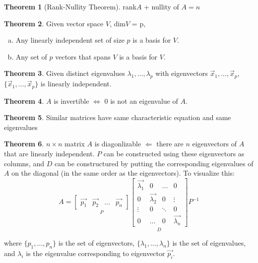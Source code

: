 \documentclass[a4paper,12pt]{article}
\theoremstyle{definition}
\newtheorem{theorem}{Theorem}
\theoremstyle{definition}
\newcommand{\finitevecs}[2]{#1_1,\ldots,#1_#2}
\newcommand{\finitevecsset}[2]{\{\finitevecs{#1}{#2}\}}
\begin{document}
	\begin{theorem}[Rank-Nullity Theorem]
		\label{thm:rank-nul-thm}
		rank$A$ + nullity of $A = n$
	\end{theorem}
	
	\begin{theorem}
		\label{thm:vec-spc-dim-thm}
		Given vector space $V$, dim$V$ = p,
		\begin{enumerate}[a.]
			\item Any linearly independent set of size $p$ is a basis for $V$.
			
			\item Any set of $p$ vectors that spans $V$ is a basis for $V$.
		\end{enumerate}
	\end{theorem}
	
	\begin{theorem}
		\label{thm:eigen-vec-lin-indep-thm}
		Given distinct eigenvalues $\finitevecs{\lambda}{p}$ with eigenvectors $\finitevecs{\vec{x}}{p}$, $\finitevecsset{\vec{x}}{p}$ is linearly independent.
	\end{theorem}
	
	\begin{theorem}
		\label{thm:zero-eigenval-invertibility-thm}
		$A$ is invertible $\Leftrightarrow$ 0 is not an eigenvalue of $A$.
	\end{theorem}
	
	\begin{theorem}
		\label{similar-mat-char-eq-thm}
		Similar matrices have same characteristic equation and same eigenvalues
	\end{theorem}
	
	\begin{theorem}
		\label{thm:diagonlization-thm}
		$n \times n$ matrix $A$ is diagonlizable $\Leftarrow$ there are $n$ eigenvectors of $A$ that are linearly independent. $P$ can be constructed using these eigenvectors as columns, and $D$ can be constructured by putting the corresponding eigenvalues of $A$ on the diagonal (in the same order as the eigenvectors). To visualize this:
		\begin{equation*}
			A =
			\underset{P}{
				\begin{bmatrix}
					\vec{p_1} & \vec{p_2} & \ldots & \vec{p_n}
				\end{bmatrix}
			}
			\underset{D}{
				\begin{bmatrix}
					\vec{\lambda_1} & 0 & \ldots & 0\\
					0 & \vec{\lambda_2} & 0 & \vdots\\
					\vdots & 0 & \ddots & 0\\
					0 & \ldots & 0 & \vec{\lambda_n}
				\end{bmatrix}
			}
			P^{-1}
		\end{equation*}
		
		where $\finitevecsset{p}{n}$ is the set of eigenvectors, $\finitevecsset{\lambda}{n}$ is the set of eigenvalues, and $\lambda_i$ is the eigenvalue corresponding to eigenvector $\vec{p_i}$.
	\end{theorem}
	
\end{document}
